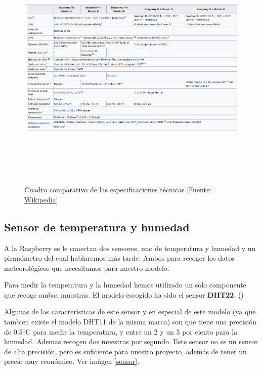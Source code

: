 \begin{figure}[htb]
	\begin{center}
		\includegraphics[width=17cm,height=12cm]{figures/Cuadro_Tipos_Raspberry.png}
		\caption{Cuadro comparativo de las especificaciones técnicas [Fuente: \href{www.wikipedia.org}{Wikipedia}]}
	\end{center}

	\label{types}
\end{figure}

\subsection{Sensor de temperatura y humedad}
\label{makereference2.3.2}

A la Raspberry se le conectan dos sensores, uno de temperatura y humedad y un piranómetro del cual hablaremos más tarde. Ambos para recoger los datos meteorológicos que necesitamos para nuestro modelo.

Para medir la temperatura y la humedad hemos utilizado un solo componente que recoge ambas muestras. El modelo escogido ha sido el sensor \textbf{DHT22}. (\cite{ARP:Adafruit:2017})

\cite{ARP:AppliedPredictiveModeling:2017}

Algunas de las características de este sensor y en especial de este modelo (ya que tambien existe el modelo DHT11 de la misma marca) son que tiene una precisión de 0.5ºC para medir la temperatura, y entre un 2 y un 5 por ciento para la humedad. Ademas recogen dos muestras por segundo. Este sensor no es un sensor de alta precisión, pero es suficiente para nuestro proyecto, además de tener un precio muy económico. Ver imágen \ref{sensor}.


